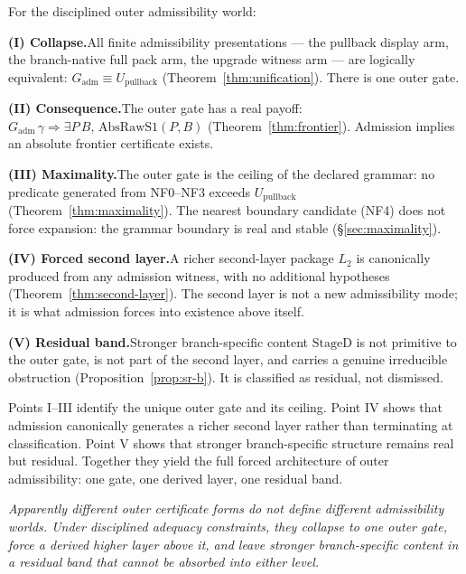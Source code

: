 \documentclass[11pt]{article}
\theoremstyle{plain}
\theoremstyle{definition}
\theoremstyle{remark}
\newcommand{\Gadm}{G_{\mathrm{adm}}}
\newcommand{\Upb}{U_{\mathrm{pullback}}}
\newcommand{\AbsRawSone}{\mathrm{AbsRawS1}}
\newcommand{\Stwo}{L_2}
\newcommand{\StageD}{\mathrm{StageD}}
\begin{document}
\begin{keybox}[title=Main theorem of the outer admissibility program]
For the disciplined outer admissibility world:

\medskip
\noindent\textbf{(I) Collapse.}\quad All finite admissibility presentations
--- the pullback display arm, the branch-native full pack arm, the
upgrade witness arm --- are logically equivalent: $\Gadm \equiv \Upb$
(Theorem~\ref{thm:unification}).  There is one outer gate.

\medskip
\noindent\textbf{(II) Consequence.}\quad The outer gate has a real payoff:
$\Gadm\,\gamma \Rightarrow \exists P\,B,\,\AbsRawSone(P,B)$
(Theorem~\ref{thm:frontier}).  Admission implies an absolute frontier
certificate exists.

\medskip
\noindent\textbf{(III) Maximality.}\quad The outer gate is the ceiling of
the declared grammar: no predicate generated from NF0--NF3 exceeds $\Upb$
(Theorem~\ref{thm:maximality}).  The nearest boundary candidate (NF4) does
not force expansion: the grammar boundary is real and stable
(\S\ref{sec:maximality}).

\medskip
\noindent\textbf{(IV) Forced second layer.}\quad A richer second-layer
package $\Stwo$ is canonically produced from any admission witness, with
no additional hypotheses (Theorem~\ref{thm:second-layer}).  The second
layer is not a new admissibility mode; it is what admission forces into
existence above itself.

\medskip
\noindent\textbf{(V) Residual band.}\quad Stronger branch-specific content
$\StageD$ is not primitive to the outer gate, is not part of the second
layer, and carries a genuine irreducible obstruction
(Proposition~\ref{prop:sr-b}).  It is classified as residual, not
dismissed.
\end{keybox}

\noindent
Points I--III identify the unique outer gate and its ceiling.  Point IV shows
that admission canonically generates a richer second layer rather than
terminating at classification.  Point V shows that stronger branch-specific
structure remains real but residual.  Together they yield the full forced
architecture of outer admissibility: one gate, one derived layer, one
residual band.

\begin{keybox}
\centering
\emph{Apparently different outer certificate forms do not define different
admissibility worlds.  Under disciplined adequacy constraints, they collapse
to one outer gate, force a derived higher layer above it, and leave stronger
branch-specific content in a residual band that cannot be absorbed into
either level.}
\end{keybox}
\end{document}

